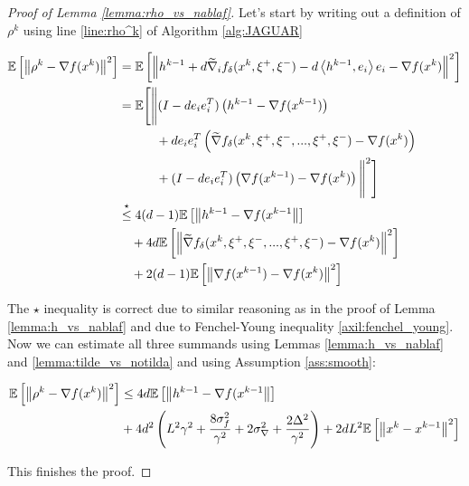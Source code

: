     \begin{proof}[Proof of Lemma \ref{lemma:rho_vs_nablaf}]
    
        Let's start by writing out a definition of $\rho^{k}$ using line \ref{line:rho^k} of Algorithm \ref{alg:JAGUAR}

        \begin{equation*}
        \begin{split}
            \mathbb{E}\left[ \left\| \rho^k - \nabla f(x^k) \right\|^2 \right]
            &=
            \mathbb{E}\left[ \left\| h^{k-1} + d \widetilde{\nabla}_i f_\delta (x^k, \xi^+, \xi^-) - d \left\langle h^{k-1},e_i \right\rangle e_i - \nabla f(x^k) \right\|^2 \right]
            \\&=
            \mathbb{E}\Bigg[\Bigg\|(I - d e_i e_i^T)\left(h^{k-1} - \nabla f(x^{k-1})\right) 
            \\&\qquad\quad+ 
            de_ie_i^T \left( \widetilde{\nabla} f_\delta(x^k, \xi^+, \xi^-, ... , \xi^+, \xi^-) - \nabla f(x^k)\right)
            \\&\qquad\quad+ 
            (I - d e_i e_i^T)\left(\nabla f(x^{k-1}) - \nabla f(x^k)\right)
            \Bigg\|^2\Bigg]
            \\&\overset{\star}{\leq}
            4 (d-1) \mathbb{E}\left[ \left\| h^{k-1} - \nabla f(x^{k-1} \right\| \right] 
            \\&\quad+ 4 d \mathbb{E}\left[ \left\| \widetilde{\nabla} f_\delta(x^k, \xi^+, \xi^-, ... , \xi^+, \xi^-) - \nabla f(x^k) \right\|^2 \right] 
            \\&\quad+ 2 (d-1) \mathbb{E}\left[ \left\| \nabla f(x^{k-1}) - \nabla f(x^k) \right\|^2 \right]
        \end{split}
        \end{equation*}

        The $\star$ inequality is correct due to similar reasoning as in the proof of Lemma \ref{lemma:h_vs_nablaf} and due to Fenchel-Young inequality \ref{axil:fenchel_young}. Now we can estimate all three summands using Lemmas \ref{lemma:h_vs_nablaf} and \ref{lemma:tilde_vs_notilda} and using Assumption \ref{ass:smooth}:

        \begin{equation*}
        \begin{split}
            \mathbb{E}\left[ \left\| \rho^k - \nabla f(x^k) \right\|^2 \right]
            &\leq
            4d \mathbb{E}\left[ \left\| h^{k-1} - \nabla f(x^{k-1} \right\| \right] 
            \\&+ 4d^2 \left( L^2 \gamma^2 
            + \frac{8 \sigma_f^2}{\gamma^2} 
            + 2 \sigma_{\nabla}^2 + \frac{2 \Delta^2}{\gamma^2} \right)
            + 2d L^2 \mathbb{E}\left[ \left\| x^k - x^{k-1} \right\|^2 \right]
        \end{split}
        \end{equation*}

        This finishes the proof.
        
    \end{proof}

